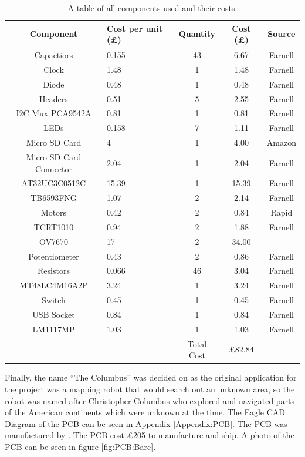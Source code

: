 \begin{table}
\centering
\begin{tabular}{|c|p{2cm}|c|c|c|} \hline
Component	&	Cost per unit (\pounds)	& Quantity 	&	Cost (\pounds)	&	Source		\\ \hline
Capactiors	&	0.155 					& 	43		& 	6.67 					& 	Farnell 	\\
Clock 		& 	1.48					& 	1		&	1.48 					& 	Farnell		\\
Diode		&	0.48					&	1		&	0.48					&	Farnell 	\\
Headers		&	0.51 					&	5		&	2.55					&	Farnell 	\\
I2C Mux PCA9542A &	0.81				&	1		&	0.81					&	Farnell		\\
LEDs 		&	0.158					&	7		& 	1.11 					&	Farnell		\\
Micro SD Card &	4						&	1		&	4.00 					&	Amazon 		\\
Micro SD Card Connector & 2.04			&	1		&	2.04					&	Farnell		\\
AT32UC3C0512C	&15.39					&	1		&	15.39					&	Farnell		\\
TB6593FNG 	&	1.07 					&	2 		&	2.14 					&	Farnell 	\\
Motors  	&	0.42					&	2		&	0.84				 	&	Rapid 		\\
TCRT1010	& 	0.94 					&	2		&	1.88 					&	Farnell 	\\
OV7670		&	17						&	2		&	34.00					& 				\\
Potentiometer	&	0.43				&	2		&	0.86					&	Farnell 	\\
Resistors	&	0.066 					& 	46		&	3.04 					&	Farnell 	\\
MT48LC4M16A2P	& 3.24  				& 	1		&	3.24 					&	Farnell		\\
Switch		&	0.45					&	1		&	0.45					&	Farnell 	\\
USB Socket	&	0.84 					&	1		& 	0.84 					&	Farnell 	\\
LM1117MP	&	1.03					&	1		&	1.03	 				&	Farnell		\\ \hline \cline{3-4}
\multicolumn{2}{c|}{ }					& Total Cost  & \pounds 82.84			&	\multicolumn{1}{|c}{ }			\\ \cline{3-4}
\end{tabular}
\caption{A table of all components used and their costs.}
\label{table:Costings}
\end{table}

Finally, the name ``The Columbus'' was decided on as the original application for the project was a mapping robot that would search out an unknown area, so the robot was named after Christopher Columbus who explored and navigated parts of the American continents which were unknown at the time. The Eagle CAD Diagram of the PCB can be seen in Appendix \ref{Appendix:PCB}. The PCB was manufactured by \cite{PCBCart}. The PCB cost \pounds 205 to manufacture and ship. A photo of the PCB can be seen in figure \ref{fig:PCB:Bare}. 

